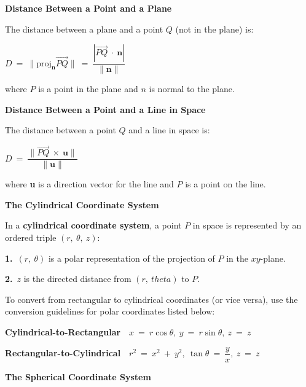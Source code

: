 \documentclass{article}
\begin{document}
\begin{large}
\textbf{Distance Between a Point and a Plane}

\hspace{0.1in} The distance between a plane and a point $Q$ (not in the plane) is:

\hspace{1.5in} $D\ =\ \|\text{proj}_{\textbf{n}}\overrightarrow{PQ}\|\ =\ \dfrac{|\overrightarrow{PQ}\ \cdot\ \textbf{n}|}{\|\textbf{n}\|}$

\hspace{0.1in} where $P$ is a point in the plane and $n$ is normal to the plane.

\textbf{Distance Between a Point and a Line in Space}

\hspace{0.1in} The distance between a point $Q$ and a line in space is:

\hspace{1.5in} $D\ =\ \dfrac{\|\overrightarrow{PQ}\ \times\ \textbf{u}\|}{\|\textbf{u}\|}$

\hspace{0.1in} where \textbf{u} is a direction vector for the line and $P$ is a point on the line.

\textbf{The Cylindrical Coordinate System}

\hspace{0.1in} In a \textbf{cylindrical coordinate system}, a point $P$ in space is represented by an ordered triple $(r,\ \theta,\ z)$:

\hspace{0.2in} \textbf{1.}\ $(r,\ \theta)$ is a polar representation of the projection of $P$ in the $xy$-plane.

\hspace{0.2in} \textbf{2.}\ $z$ is the directed distance from $(r,\ theta)$ to $P$.

\hspace{0.1in} To convert from rectangular to cylindrical coordinates (or vice versa), use the conversion guidelines for polar coordinates listed below:

\hspace{0.2in} \textbf{Cylindrical-to-Rectangular}\ \ $x\ =\ r\cos \theta,\ y\ =\ r\sin \theta,\ z\ =\ z$

\hspace{0.2in} \textbf{Rectangular-to-Cylindrical}\ \ $r^{2}\ =\ x^{2}\ +\ y^{2},\ \tan \theta\ =\ \dfrac{y}{x},\ z\ =\ z$

\vspace{1.8in}
\textbf{The Spherical Coordinate System}


\end{large}
\end{document}

